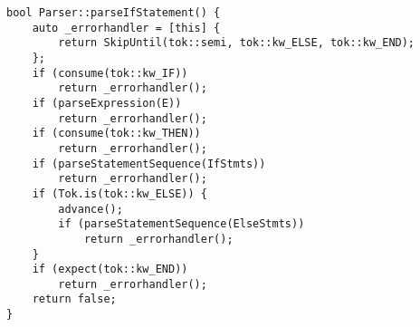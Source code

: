 \begin{lstlisting}[caption={}]
bool Parser::parseIfStatement() {
	auto _errorhandler = [this] {
		return SkipUntil(tok::semi, tok::kw_ELSE, tok::kw_END);
	};
	if (consume(tok::kw_IF))
		return _errorhandler();
	if (parseExpression(E))
		return _errorhandler();
	if (consume(tok::kw_THEN))
		return _errorhandler();
	if (parseStatementSequence(IfStmts))
		return _errorhandler();
	if (Tok.is(tok::kw_ELSE)) {
		advance();
		if (parseStatementSequence(ElseStmts))
			return _errorhandler();
	}
	if (expect(tok::kw_END))
		return _errorhandler();
	return false;
}
\end{lstlisting}
























